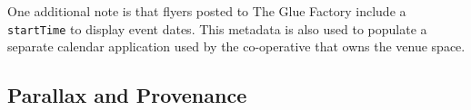 


One additional note is that flyers posted to The Glue Factory include a \texttt{startTime}
to display event dates.
This metadata is also used to populate a separate calendar application
used by the co-operative that owns the venue space.




\subsection{Parallax and Provenance}
\label{case-studies:parallax}


